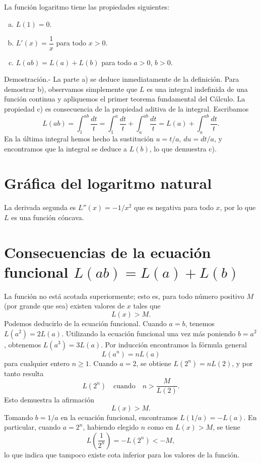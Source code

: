 \begin{teo}
    La función logaritmo tiene las propiedades siguientes:
    \begin{enumerate}[a)]
	\item $L(1)=0.$
	\item $L'(x)=\dfrac{1}{x}$ para todo $x>0.$
	\item $L(ab)=L(a)+L(b)$ para todo $a>0$, $b>0.$\\
    \end{enumerate}
	Demostración.-\; La parte a) se deduce inmediatamente de la definición. Para demostrar b), observamos simplemente que $L$ es una integral indefinida de una función continua y apliquemos el primer teorema fundamental del Cálculo. La propiedad c) es consecuencia de la propiedad aditiva de la integral. Escribamos
	$$L(ab)=\int_1^{ab}\dfrac{dt}{t}=\int_1^a \dfrac{dt}{t}+\int_a^{ab}\dfrac{dt}{t}=L(a)+\int_a^{ab}\dfrac{dt}{t}.$$
	En la última integral hemos hecho la sustitución $u=t/a$, $du=dt/a$, y encontramos que la integral se deduce a $L(b)$, lo que demuestra c).
\end{teo}


\section{Gráfica del logaritmo natural}
La derivada segunda es $L''(x) = - 1/x^2$ que es negativa para todo $x$, por lo que $L$ es una función cóncava.

\section{Consecuencias de la ecuación funcional \boldmath$L(ab)=L(a)+L(b)$}

La función no está acotada superiormente; esto es, para todo número positivo $M$ (por grande que sea) existen valores de $x$ tales que
$$L(x)>M.$$
Podemos deducirlo de la ecuación funcional. Cuando $a=b$, tenemos $L\left(a^2\right)=2L(a)$. Utilizando la ecuación funcional una vez más poniendo $b=a^2$, obtenemos $L\left(a^3\right)=3L(a)$. Por inducción encontramos la fórmula general
$$L\left(a^n\right)=nL(a)$$
para cualquier entero $n\geq 1$. Cuando $a=2$, se obtiene $L\left(2^n\right)=nL(2)$, y por tanto resulta
$$L\left(2^n\right) \quad \mbox{cuando}\quad n>\dfrac{M}{L(2)}.$$
Esto demuestra la afirmación 
$$L(x)>M.$$
Tomando $b=1/a$ en la ecuación funcional, encontramos $L(1/a)=-L(a)$. En particular, cuando $a=2^n$, habiendo elegido $n$ como en $L(x)>M$, se tiene
$$L\left(\dfrac{1}{2^n}\right)=-L(2^n)<-M,$$
lo que indica que tampoco existe cota inferior para los valores de la función.

